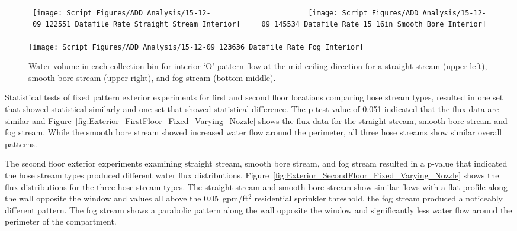 \documentclass[12pt,oneside]{book}
\begin{document}
\begin{figure}[ht]
\begin{tabular*}{\textwidth}{lr}
\texttt{[image: Script\_Figures/ADD\_Analysis/15-12-09\_122551\_Datafile\_Rate\_Straight\_Stream\_Interior]} &
\texttt{[image: Script\_Figures/ADD\_Analysis/15-12-09\_145534\_Datafile\_Rate\_15\_16in\_Smooth\_Bore\_Interior]} \\
\end{tabular*}
\centering
\texttt{[image: Script\_Figures/ADD\_Analysis/15-12-09\_123636\_Datafile\_Rate\_Fog\_Interior]}
\caption[Water Flux for Varying Interior `O' Pattern Hose Stream Types]{Water volume in each collection bin for interior `O' pattern flow at the mid-ceiling direction for a straight stream (upper left), smooth bore stream (upper right), and fog stream (bottom middle).}
\label{fig:Interior_Varying_Nozzle_Types_O_Pattern}
\end{figure}

\clearpage

Statistical tests of fixed pattern exterior experiments for first and second floor locations comparing hose stream types, resulted in one set that showed statistical similarly and one set that showed statistical difference. The p-test value of 0.051 indicated that the flux data are similar and Figure~\ref{fig:Exterior_FirstFloor_Fixed_Varying_Nozzle} shows the flux data for the straight stream, smooth bore stream and fog stream. While the smooth bore stream showed increased water flow around the perimeter, all three hose streams show similar overall patterns. 

The second floor exterior experiments examining straight stream, smooth bore stream, and fog stream resulted in a p-value that indicated the hose stream types produced different water flux distributions. Figure~\ref{fig:Exterior_SecondFloor_Fixed_Varying_Nozzle} shows the flux distributions for the three hose stream types. The straight stream and smooth bore stream show similar flows with a flat profile along the wall opposite the window and values all above the 0.05~gpm/ft$^2$ residential sprinkler threshold, the fog stream produced a noticeably different pattern. The fog stream shows a parabolic pattern along the wall opposite the window and significantly less water flow around the perimeter of the compartment. 
\end{document}
